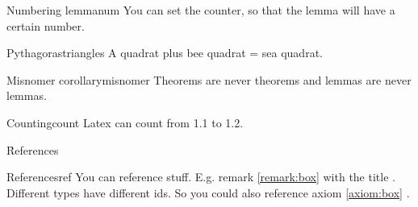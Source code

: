 \begin{multicols*}{3}
  \begin{lemma}{Numbering lemma}{num}
    You can set the counter, so that the lemma will have a certain number.
  \end{lemma}

  \begin{satz}{Pythagoras}{triangles}
    A quadrat plus bee quadrat = sea quadrat.
  \end{satz}

  \begin{theorem}{Misnomer corollary}{misnomer}
    Theorems are never theorems and lemmas are never lemmas.
  \end{theorem}


  \begin{axiom}{Counting}{count}
    Latex can count from 1.1 to 1.2.
  \end{axiom}

  \h{References}

  \begin{corollary}{References}{ref}
    You can reference stuff. E.g. remark \ref{remark:box} with the title . \\
    Different types have different ids. So you could also reference axiom \ref{axiom:box} .
  \end{corollary}

\end{multicols*}


